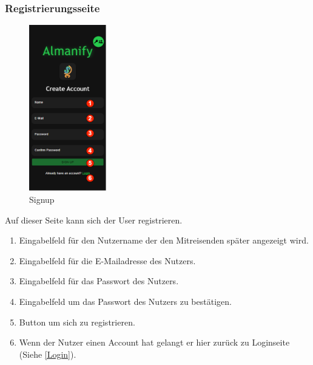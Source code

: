 \subsubsection{Registrierungsseite}\label{Signup}
\begin{figure}[H]
    \centering
    \includegraphics[width=0.3\textwidth]{img/pages_numbers/signup.drawio}
    \caption[Signup]{Signup}
    \label{fig:Signup}
\end{figure}
Auf dieser Seite kann sich der User registrieren.
\begin{enumerate}[label=\protect\circled{\arabic*}]
	\item Eingabelfeld für den Nutzername der den Mitreisenden später angezeigt wird.
	\item Eingabelfeld für die E-Mailadresse des Nutzers.
	\item Eingabelfeld für das Passwort des Nutzers.
	\item Eingabelfeld um das Passwort des Nutzers zu bestätigen.
	\item Button um sich zu registrieren.
	\item Wenn der Nutzer einen Account hat gelangt er hier zurück zu Loginseite (Siehe \ref{Login}).
\end{enumerate}

